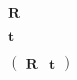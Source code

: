 \documentclass{article}
\begin{document}
$ \mathbf{R} $
\pagebreak

$ \mathbf{t} $
\pagebreak

$ \left( \begin{array}{cc} \mathbf{R} & \mathbf{t} \end{array} \right) $
\pagebreak
\end{document}
